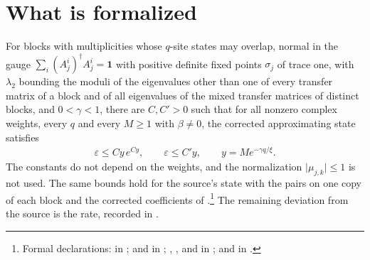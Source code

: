 \documentclass{article}
\begin{document}
\section{What is formalized}
For blocks with multiplicities whose $q$-site states may overlap, normal in the gauge
$\sum_i(A_j^i)^\dagger A_j^i=\mathbf 1$ with positive definite fixed points $\sigma_j$ of trace
one, with $\lambda_2$ bounding the moduli of the eigenvalues other than one of every transfer
matrix of a block and of all eigenvalues of the mixed transfer matrices of distinct blocks,
and $0<\gamma<1$, there are $C,C'>0$ such that for all nonzero complex weights, every $q$
and every $M\geq1$ with $\beta\neq0$, the corrected approximating state satisfies
\begin{align*}
    \varepsilon\leq Cy\,e^{Cy},\qquad\varepsilon\leq C'y,\qquad y=Me^{-\gamma q/\xi}.
\end{align*}
The constants do not depend on the weights, and the normalization $\lvert\mu_{j,k}\rvert\leq1$
is not used. The same bounds hold for the source's state with the pairs on one copy of each
block and the corrected coefficients of
\cite{gap:mswc24_multiplicity_fixed_point}.\footnote{Formal declarations:
     in
    ;
     and
     in
    ;
    ,
    ,
     and
     in
    ;
     and
    in .}
The remaining deviation from the source is the rate, recorded in
\cite{gap:mswc24_block_form_mixed_overlap}.
\end{document}
